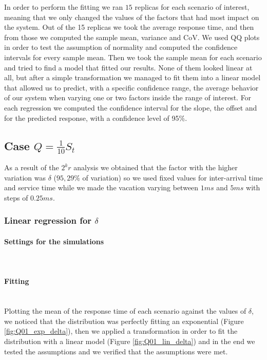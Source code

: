 \documentclass{article}
\begin{document}
        In order to perform the fitting we ran $15$ replicas for each scenario of interest, meaning that we only changed the values of the factors that had most impact on the system. Out of the 15 replicas we took the average response time, and then from those we computed the sample mean, variance and CoV. We used QQ plots in order to test the assumption of normality and computed the confidence intervals for every sample mean. Then we took the sample mean for each scenario and tried to find a model that fitted our results. None of them looked linear at all, but after a simple transformation we managed to fit them into a linear model that allowed us to predict, with a specific confidence range, the average behavior of our system when varying one or two factors inside the range of interest.
        For each regression we computed the confidence interval for the slope, the offset and for the predicted response, with a confidence level of 95\%.

\newpage
        \subsection{Case $Q = \frac{1}{10}S_t$}
            As a result of the $2^k r$ analysis we obtained that the factor with the higher variation was $\delta$ ($95,29\%$ of variation) so we used fixed values for inter-arrival time and service time while we made the vacation varying between $1ms$ and $5ms$ with steps of $0.25ms$. 
            
            \subsubsection{Linear regression for $\delta$}
                \paragraph{Settings for the simulations} \hfill \\
                    
                    
                \paragraph{Fitting} \hfill \\
                    Plotting the mean of the response time of each scenario against the values of $\delta$, we noticed that the distribution was perfectly fitting an exponential (Figure \ref{fig:Q01_exp_delta}), then we applied a transformation in order to fit the distribution with a linear model (Figure \ref{fig:Q01_lin_delta}) and in the end we tested the assumptions and we verified that the assumptions were met. \\
                    
\end{document}
